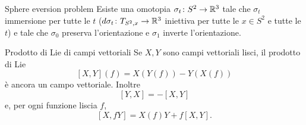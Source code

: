 \documentclass[a4paper]{article}
\begin{document}
\begin{snippettheorem}{Sphere eversion problem}
    Esiste una omotopia
    \(\sigma_t \colon S^2 \to \mathbb{R}^3\)
    tale che \(\sigma_t\)
    immersione per tutte le \(t\)
    (\(d\sigma_t \colon T_{S^2, x} \to \mathbb{R}^3\) iniettiva
    per tutte le \(x \in S^2\) e tutte le \(t\))
    e tale che
    \(\sigma_0\) preserva l'orientazione
    e \(\sigma_1\) inverte l'orientazione.
\end{snippettheorem}



\begin{snippetproposition}{Prodotto di Lie di campi vettoriali}
    Se \(X,Y\) sono campi vettoriali lisci, il prodotto di Lie
    \[
        [X,Y](f)=X(Y(f))-Y(X(f))
    \]
    è ancora un campo vettoriale. Inoltre
    \[
        [Y,X]=-[X,Y]
    \]
    e, per ogni funzione liscia \(f\),
    \[
        [X,fY]=X(f)Y+f[X,Y].
    \]
\end{snippetproposition}
\end{document}
